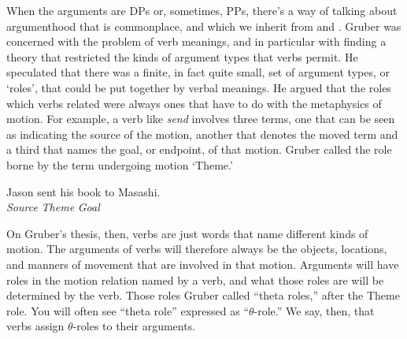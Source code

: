 When the arguments are DPs or, sometimes, PPs, there's a way of talking about argumenthood that is commonplace, and which we inherit from \citet{Gruber:1965} and \citet{Jackendoff:1972}. Gruber was concerned with the problem of verb meanings, and in particular with finding a theory that restricted the kinds of argument types that verbs permit. He speculated that there was a finite, in fact quite small, set of argument types, or `roles', that could be put together by verbal meanings. He argued that the roles which verbs related were always ones that have to do with the metaphysics of motion. For example, a verb like \emph{send} involves three terms, one that can be seen as indicating the source of the motion, another that denotes the moved term and a third that names the goal, or endpoint, of that motion. Gruber called the role borne by the term undergoing motion `Theme.'
\begin{exe}
	\ex \label{ex2:36} \gll Jason sent {his book} {to Masashi}.\\ 
			\emph{Source} {} \emph{Theme} \emph{Goal}\\ 
\end{exe}
On Gruber's thesis, then, verbs are just words that name different kinds of motion. The arguments of verbs will therefore always be the objects, locations, and manners of movement that are involved in that motion. Arguments will have roles in the motion relation named by a verb, and what those roles are will be determined by the verb. Those roles Gruber called ``theta roles,'' after the Theme role. You will often see ``theta role'' expressed as ``$\theta$-role.'' We say, then, that verbs assign \mbox{$\theta$-role}s to their arguments.

